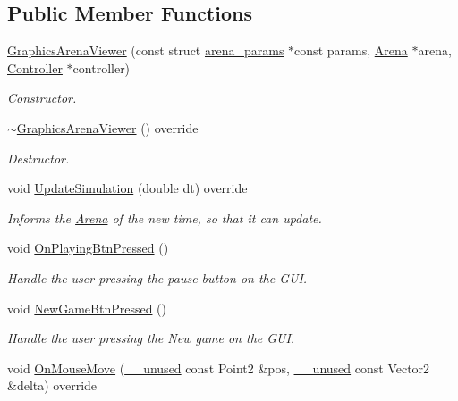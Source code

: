 \subsection*{Public Member Functions}
\begin{DoxyCompactItemize}
\item 
\hyperlink{classGraphicsArenaViewer_a869510833897508300da65b1eb0c5d09}{Graphics\+Arena\+Viewer} (const struct \hyperlink{structarena__params}{arena\+\_\+params} $\ast$const params, \hyperlink{classArena}{Arena} $\ast$arena, \hyperlink{classController}{Controller} $\ast$controller)
\begin{DoxyCompactList}\small\item\em Constructor. \end{DoxyCompactList}\item 
\hyperlink{classGraphicsArenaViewer_a88cea02aab1550a7f315fbf4f3868109}{$\sim$\+Graphics\+Arena\+Viewer} () override
\begin{DoxyCompactList}\small\item\em Destructor. \end{DoxyCompactList}\item 
void \hyperlink{classGraphicsArenaViewer_aeec66666382aa0312574d70aa58de250}{Update\+Simulation} (double dt) override
\begin{DoxyCompactList}\small\item\em Informs the \hyperlink{classArena}{Arena} of the new time, so that it can update. \end{DoxyCompactList}\item 
void \hyperlink{classGraphicsArenaViewer_a7cc65fd0e2e8c1f6138608e398c7c887}{On\+Playing\+Btn\+Pressed} ()
\begin{DoxyCompactList}\small\item\em Handle the user pressing the pause button on the G\+UI. \end{DoxyCompactList}\item 
void \hyperlink{classGraphicsArenaViewer_a2f0a3c938191d5becda127e0ddf8bf25}{New\+Game\+Btn\+Pressed} ()
\begin{DoxyCompactList}\small\item\em Handle the user pressing the New game on the G\+UI. \end{DoxyCompactList}\item 
void \hyperlink{classGraphicsArenaViewer_a74b5c524369a62ba419c89677c646d9e}{On\+Mouse\+Move} (\hyperlink{common_8h_a2e3484535ee610c8e19e9859563abe48}{\+\_\+\+\_\+unused} const Point2 \&pos, \hyperlink{common_8h_a2e3484535ee610c8e19e9859563abe48}{\+\_\+\+\_\+unused} const Vector2 \&delta) override

\end{DoxyCompactItemize}
